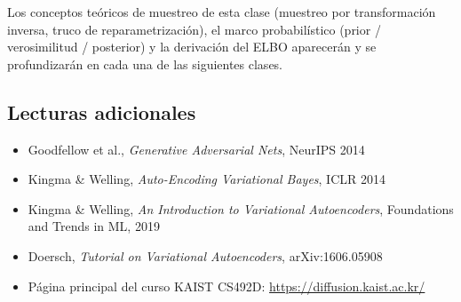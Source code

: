 Los conceptos teóricos de muestreo de esta clase (muestreo por transformación inversa, truco de reparametrización), el marco probabilístico (prior / verosimilitud / posterior) y la derivación del ELBO aparecerán y se profundizarán en cada una de las siguientes clases.

\subsection{Lecturas adicionales}

\begin{itemize}
    \item Goodfellow et al., \textit{Generative Adversarial Nets}, NeurIPS 2014
    \item Kingma \& Welling, \textit{Auto-Encoding Variational Bayes}, ICLR 2014
    \item Kingma \& Welling, \textit{An Introduction to Variational Autoencoders}, Foundations and Trends in ML, 2019
    \item Doersch, \textit{Tutorial on Variational Autoencoders}, arXiv:1606.05908
    \item Página principal del curso KAIST CS492D: \url{https://diffusion.kaist.ac.kr/}
\end{itemize}



